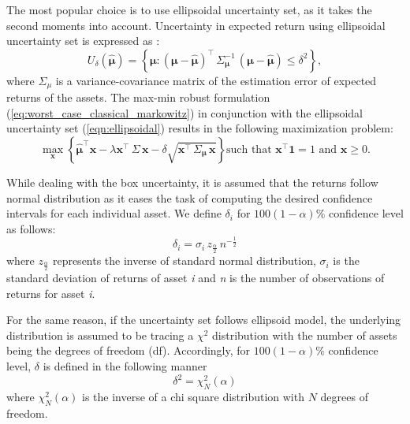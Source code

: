 The most popular choice is to use ellipsoidal uncertainty set, as it takes the second moments into account. Uncertainty in expected return using ellipsoidal uncertainty set is expressed as \cite{kim} :
\begin{equation}
\label{eqn:ellipsoidal}
U_{\delta}(\boldsymbol{\hat{\mu}}) = \left\{ \boldsymbol{\mu} : (\boldsymbol{\mu} - \boldsymbol{\hat{\mu}})^{\top} \, \Sigma^{-1}_{\boldsymbol{\mu}} \, (\boldsymbol{\mu} - \boldsymbol{\hat{\mu}}) \leq \delta^2 \right\},
\end{equation}
where $\Sigma_\mu$ is a variance-covariance matrix of the estimation error of expected returns of the assets.
The max-min robust formulation (\ref{eq:worst_case_classical_markowitz}) in conjunction with the ellipsoidal uncertainty set (\ref{eqn:ellipsoidal}) results in the following maximization problem:
\begin{equation}
\max_{\mathbf{x}} \left\{ \boldsymbol{\hat{\mu}}^{\top} \mathbf{x} - \lambda \mathbf{x}^{\top} \, \Sigma \, \mathbf{x} - \delta \sqrt{\mathbf{x}^{\top} \, \Sigma_{\boldsymbol{\mu}} \, \mathbf{x}} \right\} \text{such that } \mathbf{x^{\top}} \mathbf{1}  = 1 \text{ and } \mathbf{x} \geq 0.
\end{equation}

While dealing with the box uncertainty, it is assumed that the returns follow normal distribution as it eases the task of computing the desired confidence intervals for each individual asset. We define $\delta_{i}$ for $100(1-\alpha)\%$ confidence level as follows:
\begin{equation}
    \delta_{i}=\sigma_{i} \, z_\frac{\alpha}{2} \, n^{-\frac{1}{2}}
\end{equation}
where $z_{\frac{\alpha}{2}}$ represents the inverse of standard normal distribution, $\sigma_{i}$ is the standard deviation of returns of asset \textit{i} and \textit{n} is the number of observations of returns for asset \textit{i}.

For the same reason, if the uncertainty set follows ellipsoid model, the underlying distribution is assumed to be tracing a $\chi^2$ distribution with the number of assets being the degrees of freedom (df). Accordingly, for $100(1-\alpha)\%$ confidence level, $\delta$ is defined in the following manner
\begin{equation}
    \delta^2=\chi_{N}^2(\alpha)
\end{equation}
where $\chi_{N}^2(\alpha)$ is the inverse of a chi square distribution with $N$ degrees of freedom.
